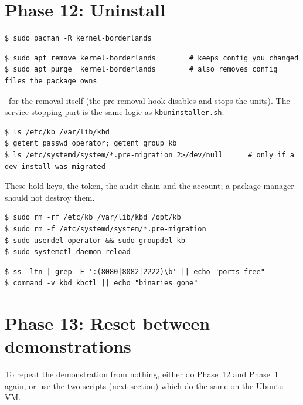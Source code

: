 \section{Phase 12: Uninstall}
\resetsteps
{}
\ifarch
\begin{lstlisting}[style=console]
$ sudo pacman -R kernel-borderlands
\end{lstlisting}
\else
\begin{lstlisting}[style=console]
$ sudo apt remove kernel-borderlands        # keeps config you changed
$ sudo apt purge  kernel-borderlands        # also removes config files the package owns
\end{lstlisting}
\fi
\notrun\ for the removal itself (the pre-removal hook disables and stops the units). The service-stopping part is the same logic as
\texttt{kbuninstaller.sh}.
\begin{lstlisting}[style=console]
$ ls /etc/kb /var/lib/kbd
$ getent passwd operator; getent group kb
$ ls /etc/systemd/system/*.pre-migration 2>/dev/null      # only if a dev install was migrated
\end{lstlisting}
These hold keys, the token, the audit chain and the account; a package manager should not destroy them.
\begin{lstlisting}[style=console]
$ sudo rm -rf /etc/kb /var/lib/kbd /opt/kb
$ sudo rm -f /etc/systemd/system/*.pre-migration
$ sudo userdel operator && sudo groupdel kb
$ sudo systemctl daemon-reload
\end{lstlisting}
\notrun
{}
\begin{lstlisting}[style=console]
$ ss -ltn | grep -E ':(8080|8082|2222)\b' || echo "ports free"
$ command -v kbd kbctl || echo "binaries gone"
\end{lstlisting}
\notrun

\section{Phase 13: Reset between demonstrations}
To repeat the demonstration from nothing, either do Phase~12 and Phase~1 again, or use the two scripts (next section) which do the same on the Ubuntu VM.

